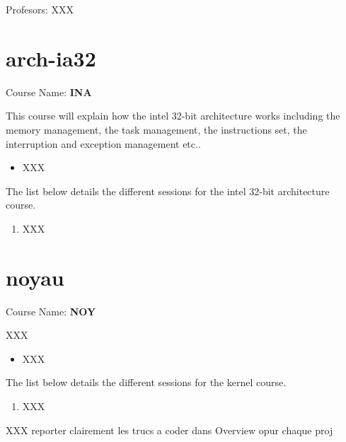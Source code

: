 \begin{multicols}{2}
Profesors: XXX



\section{arch-ia32}

Course Name: \textbf{INA}

This course will explain how the intel 32-bit architecture works including
the memory management, the task management, the instructions set, the
interruption and exception management etc..

\begin{itemize}
  \item
    XXX
\end{itemize}

The list below details the different sessions for the intel 32-bit
architecture course.

\begin{enumerate}
  \item
    XXX
\end{enumerate}



\section{noyau}

Course Name: \textbf{NOY}

XXX

\begin{itemize}
  \item
    XXX
\end{itemize}

The list below details the different sessions for the kernel course.

\begin{enumerate}
  \item
    XXX
\end{enumerate}



\end{multicols}



XXX reporter clairement les trucs a coder dans Overview opur chaque proj
